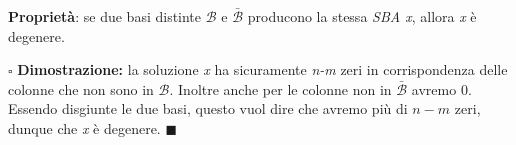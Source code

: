 \documentclass[11pt]{book}
\begin{document}
\vspace{11pt}
{\bf Propriet\`a}: se due basi distinte $\mathcal{B}$ e
$\bar{\mathcal{B}}$ producono la stessa {\em SBA x}, allora {\em x}
\`e degenere.
\newline

\vspace{11pt} $\square$ {\bf Dimostrazione:} la soluzione {\em x} ha
sicuramente {\em n-m} zeri in corrispondenza delle colonne che non
sono in $\mathcal{B}$. Inoltre anche per le colonne non in
$\bar{\mathcal{B}}$ avremo 0. Essendo disgiunte le due basi, questo
vuol dire che avremo pi\`u di $n-m$ zeri, dunque che {\em x} \`e
degenere.  $\blacksquare$
\newline\vspace{11pt}
\end{document}
